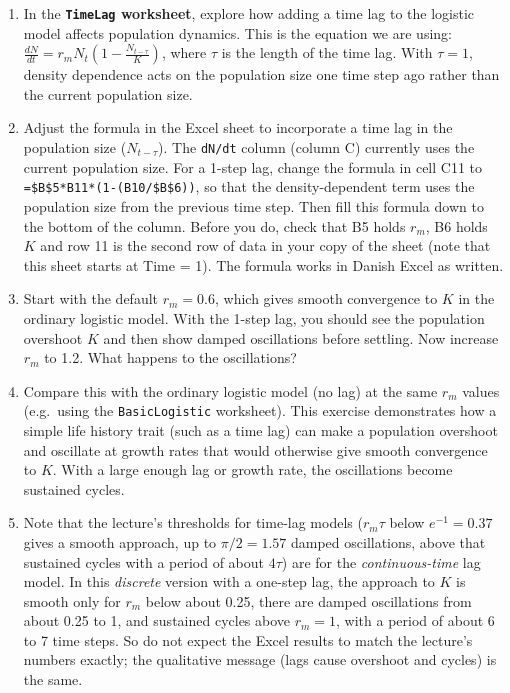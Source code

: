 \documentclass[
  a4paper]{book}
\begin{document}
\begin{enumerate}
\def\labelenumi{\arabic{enumi}.}
\item
  In the \textbf{\texttt{TimeLag} worksheet}, explore how adding a time lag to the logistic model affects population dynamics. This is the equation we are using: \(\frac{dN}{dt}=r_m N_t\left(1-\frac{N_{t-\tau}}{K}\right)\), where \(\tau\) is the length of the time lag. With \(\tau = 1\), density dependence acts on the population size one time step ago rather than the current population size.
\item
  Adjust the formula in the Excel sheet to incorporate a time lag in the population size (\(N_{t-\tau}\)). The \texttt{dN/dt} column (column C) currently uses the current population size. For a 1-step lag, change the formula in cell C11 to \texttt{=\$B\$5*B11*(1-(B10/\$B\$6))}, so that the density-dependent term uses the population size from the previous time step. Then fill this formula down to the bottom of the column. Before you do, check that B5 holds \(r_m\), B6 holds \(K\) and row 11 is the second row of data in your copy of the sheet (note that this sheet starts at Time = 1). The formula works in Danish Excel as written.
\item
  Start with the default \(r_m = 0.6\), which gives smooth convergence to \(K\) in the ordinary logistic model. With the 1-step lag, you should see the population overshoot \(K\) and then show damped oscillations before settling. Now increase \(r_m\) to 1.2. What happens to the oscillations?
\item
  Compare this with the ordinary logistic model (no lag) at the same \(r_m\) values (e.g.~using the \texttt{BasicLogistic} worksheet). This exercise demonstrates how a simple life history trait (such as a time lag) can make a population overshoot and oscillate at growth rates that would otherwise give smooth convergence to \(K\). With a large enough lag or growth rate, the oscillations become sustained cycles.
\item
  Note that the lecture's thresholds for time-lag models (\(r_m\tau\) below \(e^{-1} = 0.37\) gives a smooth approach, up to \(\pi/2 = 1.57\) damped oscillations, above that sustained cycles with a period of about \(4\tau\)) are for the \emph{continuous-time} lag model. In this \emph{discrete} version with a one-step lag, the approach to \(K\) is smooth only for \(r_m\) below about 0.25, there are damped oscillations from about 0.25 to 1, and sustained cycles above \(r_m = 1\), with a period of about 6 to 7 time steps. So do not expect the Excel results to match the lecture's numbers exactly; the qualitative message (lags cause overshoot and cycles) is the same.
\end{enumerate}
\end{document}
